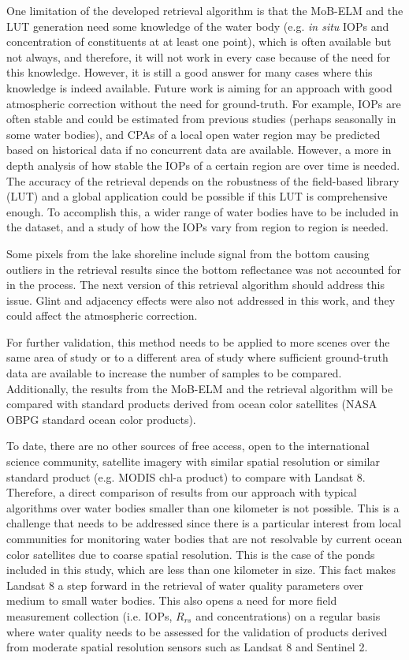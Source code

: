 \documentclass[onecolumn,3p,letterpaper]{elsarticle}
\begin{document}
One limitation of the developed retrieval algorithm is that the MoB-ELM and the LUT generation need some knowledge of the water body (e.g. {\it in situ} IOPs and concentration of constituents at at least one point), which is often available but not always, and therefore, it will not work in every case because of the need for this knowledge. However, it is still a good answer for many cases where this knowledge is indeed available. Future work is aiming for an approach with good atmospheric correction without the need for ground-truth. For example, IOPs are often stable and could be estimated from previous studies (perhaps seasonally in some water bodies), and CPAs of a local open water region may be predicted based on historical data if no concurrent data are available. However, a more in depth analysis of how stable the IOPs of a certain region are over time is needed. The accuracy of the retrieval depends on the robustness of the field-based library (LUT) and a global application could be possible if this LUT is comprehensive enough. To accomplish this, a wider range of water bodies have to be included in the dataset, and a study of how the IOPs vary from region to region is needed.

Some pixels from the lake shoreline include signal from the bottom causing outliers in the retrieval results since the bottom reflectance was not accounted for in the process. The next version of this retrieval algorithm should address this issue. Glint and adjacency effects were also not addressed in this work, and they could affect the atmospheric correction.

For further validation, this method needs to be applied to more scenes over the same area of study or to a different area of study where sufficient ground-truth data are available to increase the number of samples to be compared. Additionally, the results from the MoB-ELM and the retrieval algorithm will be compared with standard products derived from ocean color satellites (NASA OBPG standard ocean color products).

To date, there are no other sources of free access, open to the international science community, satellite imagery with similar spatial resolution or similar standard product (e.g. MODIS chl-a product) to compare with Landsat 8. Therefore, a direct comparison of results from our approach with typical algorithms over water bodies smaller than one kilometer is not possible. This is a challenge that needs to be addressed since there is a particular interest from local communities for monitoring water bodies that are not resolvable by current ocean color satellites due to coarse spatial resolution. This is the case of the ponds included in this study, which are less than one kilometer in size. This fact makes Landsat 8 a step forward in the retrieval of water quality parameters over medium to small water bodies. This also opens a need for more field measurement collection (i.e. IOPs, $R_{rs}$ and concentrations) on a regular basis where water quality needs to be assessed for the validation of products derived from moderate spatial resolution sensors such as Landsat 8 and Sentinel 2. 
\end{document}
